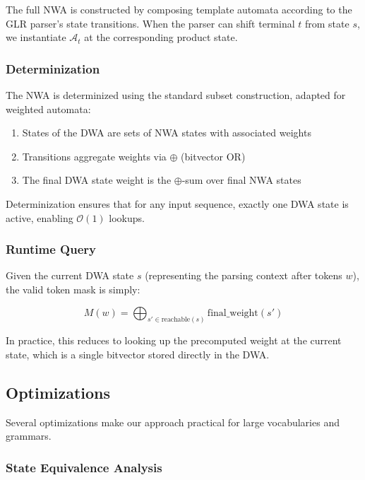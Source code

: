 \documentclass[11pt,a4paper]{article}
\newcommand{\bigO}{\mathcal{O}}
\newcommand{\automaton}{\mathcal{A}}
\theoremstyle{plain}
\theoremstyle{definition}
\theoremstyle{remark}
\begin{document}
The full NWA is constructed by composing template automata according to the GLR parser's state transitions. When the parser can shift terminal $t$ from state $s$, we instantiate $\automaton_t$ at the corresponding product state.

\subsubsection{Determinization}

The NWA is determinized using the standard subset construction, adapted for weighted automata:

\begin{enumerate}
\item States of the DWA are sets of NWA states with associated weights
\item Transitions aggregate weights via $\oplus$ (bitvector OR)
\item The final DWA state weight is the $\oplus$-sum over final NWA states
\end{enumerate}

Determinization ensures that for any input sequence, exactly one DWA state is active, enabling $\bigO(1)$ lookups.

\subsubsection{Runtime Query}

Given the current DWA state $s$ (representing the parsing context after tokens $w$), the valid token mask is simply:

\begin{equation}
M(w) = \bigoplus_{s' \in \text{reachable}(s)} \text{final\_weight}(s')
\end{equation}

In practice, this reduces to looking up the precomputed weight at the current state, which is a single bitvector stored directly in the DWA.

\subsection{Optimizations}
\label{sec:optimization}

Several optimizations make our approach practical for large vocabularies and grammars.

\subsubsection{State Equivalence Analysis}
\end{document}
